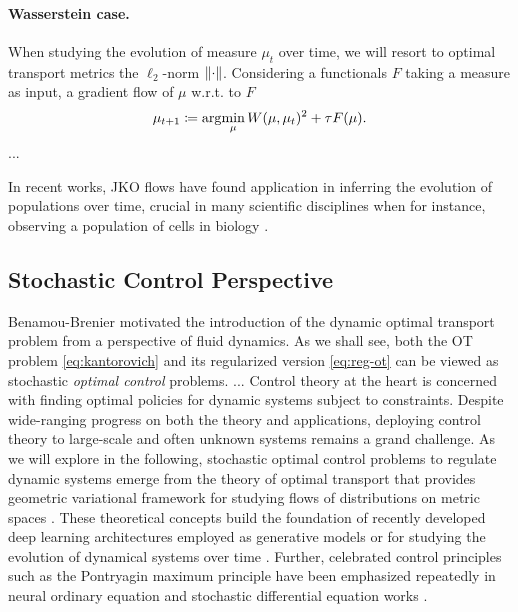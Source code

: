 \paragraph{Wasserstein case.} When studying the evolution of measure $\mu_t$ over time, we will resort to optimal transport metrics the $\ell_2$-norm $\lVert\cdot\rVert$.
Considering a functionals $F$ taking a measure as input, a gradient flow of $\mu$ w.r.t. to $F$ 
\begin{equation}
	\mu_{t+1} \coloneqq \arg\!\min_\mu W(\mu, \mu_t)^2+\tau F(\mu).
\end{equation}
...

In recent works, \acrshort{JKO} flows have found application in inferring the evolution of populations over time, crucial in many scientific disciplines when for instance, observing a population of cells in biology \citep{bunne2022proximal, alvarez2021optimizing, mokrov2021large, benamou2016augmented}.

\subsection{Stochastic Control Perspective} \label{sec:background_control}

Benamou-Brenier motivated the introduction of the dynamic optimal transport problem from a perspective of fluid dynamics.
As we shall see, both the OT problem \eqref{eq:kantorovich} and its regularized version \eqref{eq:reg-ot} can be viewed as stochastic \textit{optimal control} problems.
... %
Control theory at the heart is concerned with finding optimal policies for dynamic systems subject to constraints. Despite wide-ranging progress on both the theory and applications, deploying control theory to large-scale and often unknown systems remains a grand challenge.
As we will explore in the following, stochastic optimal control problems to regulate dynamic systems emerge from the theory of optimal transport \citep{santambrogio2015optimal} that provides geometric variational framework for studying flows of distributions on metric spaces \citep{chen2021optimal}.
These theoretical concepts build the foundation of recently developed deep learning architectures employed as generative models \citep{song2020score, de2021diffusion} or for studying the evolution of dynamical systems over time \citep{chen2021likelihood, bunne2022proximal, vargas2021solving}.
Further, celebrated control principles such as the Pontryagin maximum principle have been emphasized repeatedly in neural ordinary equation \citep{chen2018neural} and stochastic differential equation works \citep{jia2019neural}.

